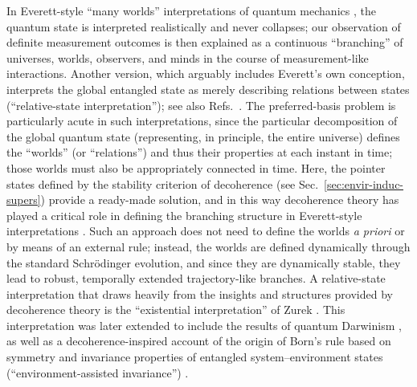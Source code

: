 \documentclass[3p,sort&compress]{elsarticle}
\begin{document}
In Everett-style ``many worlds'' interpretations of quantum mechanics \cite{Everett:1957:rw,Wallace:2010:im}, the quantum state is interpreted realistically and never collapses; our observation of definite measurement outcomes is then explained as a continuous ``branching'' of universes, worlds, observers, and minds in the course of measurement-like interactions. Another version, which arguably includes Everett's own conception, interprets the global entangled state as merely describing relations between states (``relative-state interpretation''); see also Refs.~\cite{Rovelli:1996:rq,Mermin:1998:ii}. The preferred-basis problem is particularly acute in such interpretations, since the particular decomposition of the global quantum state (representing, in principle, the entire universe) defines the ``worlds'' (or ``relations'') and thus their properties at each instant in time; those worlds must also be appropriately connected in time. Here, the pointer states defined by the stability criterion of decoherence (see Sec.~\ref{sec:envir-induc-supers}) provide a ready-made solution, and in this way decoherence theory has played a critical role in defining the branching structure in Everett-style interpretations \cite{Zurek:1998:re,Butterfield:2001:ua,Wallace:2003:iq,Wallace:2003:iz,Wallace:2010:im}. Such an approach does not need to define the worlds \emph{a priori} or by means of an external rule; instead, the worlds are defined dynamically through the standard Schr\"odinger evolution, and since they are dynamically stable, they lead to robust, temporally extended trajectory-like branches. A relative-state interpretation that draws heavily from the insights and structures provided by decoherence theory is the ``existential interpretation'' of Zurek \cite{Zurek:1993:pu,Zurek:1998:re,Zurek:2004:yb}. This interpretation was later extended to include the results of quantum Darwinism \cite{Zurek:2009:om}, as well as a decoherence-inspired account of the origin of Born's rule based on symmetry and invariance properties of entangled system--environment states (``environment-assisted invariance'') \cite{Zurek:2002:ii,Zurek:2003:rv,Zurek:2003:pl,Zurek:2004:yb,Zurek:2009:om,Zurek:2018:on,Schlosshauer:2003:ms,Barnum:2003:yb,Mohrhoff:2004:tv}.
\end{document}
